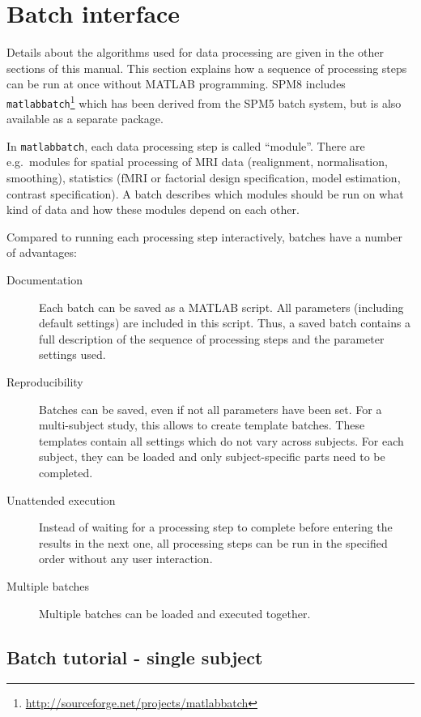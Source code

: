 \chapter{Batch interface}
\label{Chap:batch_interface}

Details about the algorithms used for data processing are given in the other
sections of this manual. This section explains how a sequence of processing
steps can be run at once without MATLAB programming. SPM8 includes
\texttt{matlabbatch}\footnote{\url{http://sourceforge.net/projects/matlabbatch}} which has been derived from the SPM5
batch system, but is also available as a separate package.

In \texttt{matlabbatch}, each data processing step is called ``module''. There
are e.g.\ modules for spatial processing of MRI data (realignment,
normalisation, smoothing), statistics (fMRI or factorial design specification,
model estimation, contrast specification). A batch describes which modules
should be run on what kind of data and how these modules depend on each other.

Compared to running each processing step interactively, batches have a number
of advantages:
\begin{description}
\item[Documentation] Each batch can be saved as a MATLAB script. All
  parameters (including default settings) are included in this script. Thus, a
  saved batch contains a full description of the sequence of processing steps
  and the parameter settings used.
\item[Reproducibility] Batches can be saved, even if not all parameters have
  been set. For a multi-subject study, this allows to create template batches.
  These templates contain all settings which do not vary across subjects. For
  each subject, they can be loaded and only subject-specific parts need to be
  completed.
\item[Unattended execution] Instead of waiting for a processing step to
  complete before entering the results in the next one, all processing steps
  can be run in the specified order without any user interaction.
\item[Multiple batches] Multiple batches can be loaded and executed together.
\end{description}

\section{Batch tutorial - single subject}

